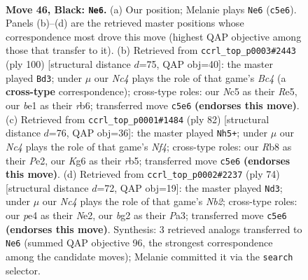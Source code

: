 \documentclass[11pt]{article}
\begin{document}
\clearpage

\begin{figure}[p]\centering
\begin{subfigure}{0.46\textwidth}\centering
\resizebox{\linewidth}{!}{%
\newchessgame
\chessboard[
  setfen={1rr2b2/7p/p2p2k1/P1n1p1Pp/1pP1P3/1P3PR1/2K3B1/R3B3 b - - 7 46},
  showmover=false,
  pgfstyle=straightmove, color=movearrow, markmove={c5-e6}
]}
\caption{}
\end{subfigure}\hfill
\begin{subfigure}{0.46\textwidth}\centering
\resizebox{\linewidth}{!}{%
\newchessgame
\chessboard[
  setfen={2r2k2/1b3p2/1r2p1p1/p1p1R1Pp/2B2P1P/1PP1R3/P1K5/8 w - - 14 51},
  showmover=false,
  pgfstyle=straightmove, color=movearrow, markmove={c4-d3}
]}
\caption{}
\end{subfigure}
\\[4pt]
\begin{subfigure}{0.46\textwidth}\centering
\resizebox{\linewidth}{!}{%
\newchessgame
\chessboard[
  setfen={2rb2n1/5pk1/4p2p/pr1p1p2/3P1N2/1P1R1PP1/3BP2P/R2K4 w - - 18 42},
  showmover=false,
  pgfstyle=straightmove, color=movearrow, markmove={f4-h5}
]}
\caption{}
\end{subfigure}\hfill
\begin{subfigure}{0.46\textwidth}\centering
\resizebox{\linewidth}{!}{%
\newchessgame
\chessboard[
  setfen={8/n1rkbp1r/4p3/1p1pP3/pP1P3p/P3PR2/1N1RN1P1/5K2 w - - 12 38},
  showmover=false,
  pgfstyle=straightmove, color=movearrow, markmove={b2-d3}
]}
\caption{}
\end{subfigure}
\caption{\textbf{Move 46, Black: \texttt{Ne6}.} (a) Our position; Melanie plays \texttt{Ne6} (\texttt{c5e6}). Panels (b)--(d) are the retrieved master positions whose correspondence most drove this move (highest QAP objective among those that transfer to it). (b) Retrieved from \texttt{ccrl\_top\_p0003\#2443} (ply 100) [structural distance $d$=75, QAP obj=40]: the master played \texttt{Bd3}; under $\mu$ our \emph{Nc4} plays the role of that game's \emph{Bc4} (a \textbf{cross-type} correspondence); cross-type roles: our \emph{N}c5 as their \emph{R}e5, our \emph{b}e1 as their \emph{r}b6; transferred move \texttt{c5e6} \textbf{(endorses this move)}. (c) Retrieved from \texttt{ccrl\_top\_p0001\#1484} (ply 82) [structural distance $d$=76, QAP obj=36]: the master played \texttt{Nh5+}; under $\mu$ our \emph{Nc4} plays the role of that game's \emph{Nf4}; cross-type roles: our \emph{R}b8 as their \emph{P}e2, our \emph{K}g6 as their \emph{r}b5; transferred move \texttt{c5e6} \textbf{(endorses this move)}. (d) Retrieved from \texttt{ccrl\_top\_p0002\#2237} (ply 74) [structural distance $d$=72, QAP obj=19]: the master played \texttt{Nd3}; under $\mu$ our \emph{Nc4} plays the role of that game's \emph{Nb2}; cross-type roles: our \emph{p}e4 as their \emph{N}e2, our \emph{b}g2 as their \emph{P}a3; transferred move \texttt{c5e6} \textbf{(endorses this move)}. Synthesis: 3 retrieved analogs transferred to \texttt{Ne6} (summed QAP objective 96, the strongest correspondence among the candidate moves); Melanie committed it via the \texttt{search} selector.}
\label{fig:thought-m91}
\end{figure}
\end{document}
